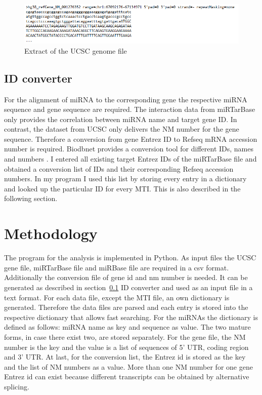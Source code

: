 \documentclass[11pt,  a4paper]{report}
\begin{document}
\begin{figure}[h]
\centering
\includegraphics[width=\textwidth]{results/ucsc.png}
\caption{Extract of the UCSC genome file}
\label{ucsc_scrot}
\end{figure}



\subsection{ID converter}
\label{sec:id}
For the alignment of miRNA to the corresponding gene the respective miRNA sequence and gene sequence are required. The interaction data from miRTarBase only provides the correlation between miRNA name and target gene ID. In contrast, the dataset from UCSC only delivers the NM number for the gene sequence. Therefore a conversion from gene Entrez ID to Refseq mRNA accession number is required. Biodbnet provides a conversion tool for different IDs, names and numbers \cite{biodb}. I entered all existing target Entrez IDs of the miRTarBase file and obtained a conversion list of IDs and their corresponding Refseq accession numbers. In my program I used this list by storing every entry in a dictionary and looked up the particular ID for every MTI. This is also described in the following section.
 


\vspace{1cm}


\section{Methodology}
\label{sec:meth}


The program for the analysis is implemented in Python. As input files the UCSC gene file, miRTarBase file and miRBase file are required in a csv format. Additionally the conversion file of gene id and nm number is needed. It can be generated as described in section~\ref{sec:id} ID converter and used as an input file in a text format. 
For each data file, except the MTI file, an own dictionary is generated. Therefore the data files are parsed and each entry is stored into the respective dictionary that allows fast searching. For the miRNAs the dictionary is defined as follows: miRNA name as key and sequence as value. The two mature forms, in case there exist two, are stored separately. For the gene file, the NM number is the key and the value is a list of sequences of 5' UTR, coding region and 3' UTR. At last, for the conversion list, the Entrez id is stored as the key and the list of NM numbers as a value. More than one NM number for one gene Entrez id can exist because different transcripts can be obtained by alternative splicing. \\
\end{document}
